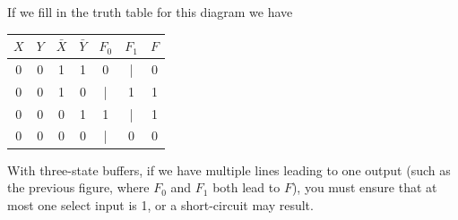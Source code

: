 \documentclass{report}
\begin{document}
If we fill in the truth table for this diagram we have
\begin{center}
\begin{tabular}{ c c | c c | c c | c }
$X$ & $Y$ & $\bar{X}$ & $\bar{Y}$ & $F_0$ & $F_1$ & $F$ \\ \hline
0 & 0 & 1 & 1 & 0 & | & 0 \\
0 & 0 & 1 & 0 & | & 1 & 1 \\
0 & 0 & 0 & 1 & 1 & | & 1 \\
0 & 0 & 0 & 0 & | & 0 & 0 \\
\end{tabular}
\end{center}
With three-state buffers, if we have multiple lines leading to one output (such as the previous figure, where $F_0$ and $F_1$ both lead to $F$), you must ensure that at most one select input is 1, or a short-circuit may result.
\end{document}
